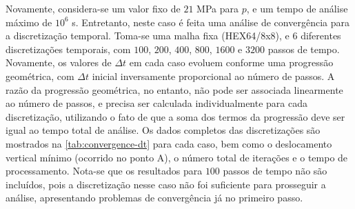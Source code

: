 \documentclass[Tese.tex]{subfiles}
\begin{document}
{Novamente, considera-se um valor fixo de $21$ MPa para $p$, e um tempo de análise máximo de $10^6$ s. Entretanto, neste caso é feita uma análise de convergência para a discretização temporal. Toma-se uma malha fixa (HEX64/8x8), e $6$ diferentes discretizações temporais, com $100$, $200$, $400$, $800$, $1600$ e $3200$ passos de tempo. Novamente, os valores de $\Delta t$ em cada caso evoluem conforme uma progressão geométrica, com $\Delta t$ inicial inversamente proporcional ao número de passos. A razão da progressão geométrica, no entanto, não pode ser associada linearmente ao número de passos, e precisa ser calculada individualmente para cada discretização, utilizando o fato de que a soma dos termos da progressão deve ser igual ao tempo total de análise. Os dados completos das discretizações são mostrados na \autoref{tab:convergence-dt} para cada caso, bem como o deslocamento vertical mínimo (ocorrido no ponto A), o número total de iterações e o tempo de processamento. Nota-se que os resultados para $100$ passos de tempo não são incluídos, pois a discretização nesse caso não foi suficiente para prosseguir a análise, apresentando problemas de convergência já no primeiro passo.

}
\end{document}
